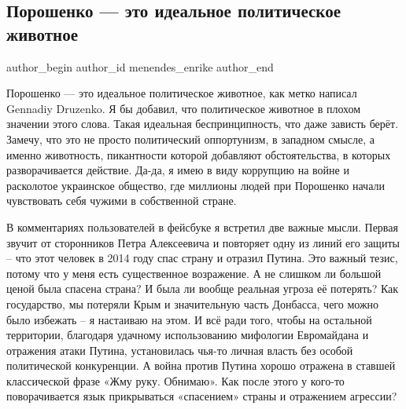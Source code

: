  
 
 
 
 
 
\subsection{Порошенко — это идеальное политическое животное}
\label{sec:17_01_2022.fb.menendes_enrike.1.poroshenko_politicheskoje_zhivotnoje}
 
\ifcmt
 author_begin
   author_id menendes_enrike
 author_end
\fi

Порошенко — это идеальное политическое животное, как метко написал Gennadiy
Druzenko. Я бы добавил, что политическое животное в плохом значении этого
слова. Такая идеальная беспринципность, что даже зависть берёт. Замечу, что это
не просто политический оппортунизм, в западном смысле, а именно животность,
пикантности которой добавляют обстоятельства, в которых разворачивается
действие. Да-да, я имею в виду коррупцию на войне и расколотое украинское
общество, где миллионы людей при Порошенко начали чувствовать себя чужими в
собственной стране. 

В комментариях пользователей в фейсбуке я встретил две важные мысли. Первая
звучит от сторонников Петра Алексеевича и повторяет одну из линий его защиты –
что этот человек в 2014 году спас страну и отразил Путина. Это важный тезис,
потому что у меня есть существенное возражение. А не слишком ли большой ценой
была спасена страна? И была ли вообще реальная угроза её потерять? Как
государство, мы потеряли Крым и значительную часть Донбасса, чего можно было
избежать – я настаиваю на этом. И всё ради того, чтобы на остальной территории,
благодаря удачному использованию мифологии Евромайдана и отражения атаки
Путина,  установилась чья-то личная власть без особой политической конкуренции.
А война против Путина хорошо отражена в ставшей классической фразе «Жму руку.
Обнимаю». Как после этого у кого-то поворачивается язык прикрываться
«спасением» страны и отражением агрессии?


